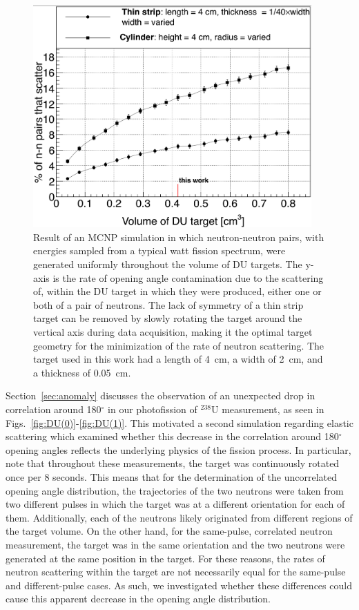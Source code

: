 \begin{figure}
    \centering
    \includegraphics[width = 0.95\textwidth]{Content/Errors/ElasticScatteringPlot.png}
    \caption{
     Result of an MCNP simulation in which neutron-neutron pairs, with energies sampled from a typical watt fission spectrum, were generated uniformly throughout the volume of DU targets.
        The y-axis is the rate of opening angle contamination due to the scattering of, within the DU target in which they were produced, either one or both of a pair of neutrons.
    The lack of symmetry of a thin strip target can be removed by slowly rotating the target around the vertical axis during data acquisition, making it the optimal target geometry for the minimization of the rate of neutron scattering.
    The target used in this work had a length of 4~cm, a width of 2~cm, and a thickness of 0.05~cm.
    }
    \label{fig:ElasticScatteringPlot}
\end{figure}

Section~\ref{sec:anomaly} discusses the observation of an unexpected drop in correlation around 180$^{\circ}$ in our photofission of $^{238}$U measurement, as seen in Figs.~\ref{fig:DU(0)}-\ref{fig:DU(1)}.
This motivated a second simulation regarding elastic scattering which examined whether this decrease in the correlation around 180$^{\circ}$ opening angles reflects the underlying physics of the fission process.
In particular, note that throughout these measurements, the target was continuously rotated once per 8 seconds.
This means that for the determination of the uncorrelated opening angle distribution, the trajectories of the two neutrons were taken from two different pulses in which the target was at a different orientation for each of them.
Additionally, each of the neutrons likely originated from different regions of the target volume.
On the other hand, for the same-pulse, correlated neutron measurement, the target was in the same orientation and the two neutrons were generated at the same position in the target.
For these reasons, the rates of neutron scattering within the target are not necessarily equal for the same-pulse and different-pulse cases.
As such, we investigated whether these differences could cause this apparent decrease in the opening angle distribution.


